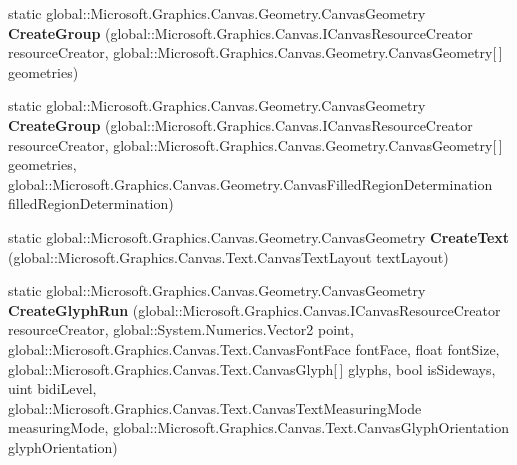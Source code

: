 \begin{DoxyCompactItemize}
static global\+::\+Microsoft.\+Graphics.\+Canvas.\+Geometry.\+Canvas\+Geometry {\bfseries Create\+Group} (global\+::\+Microsoft.\+Graphics.\+Canvas.\+I\+Canvas\+Resource\+Creator resource\+Creator, global\+::\+Microsoft.\+Graphics.\+Canvas.\+Geometry.\+Canvas\+Geometry\mbox{[}$\,$\mbox{]} geometries)
\item 
\mbox{\label{class_microsoft_1_1_graphics_1_1_canvas_1_1_geometry_1_1_canvas_geometry_a1af065a42d2349de0898d7f63c2af94a}} 
static global\+::\+Microsoft.\+Graphics.\+Canvas.\+Geometry.\+Canvas\+Geometry {\bfseries Create\+Group} (global\+::\+Microsoft.\+Graphics.\+Canvas.\+I\+Canvas\+Resource\+Creator resource\+Creator, global\+::\+Microsoft.\+Graphics.\+Canvas.\+Geometry.\+Canvas\+Geometry\mbox{[}$\,$\mbox{]} geometries, global\+::\+Microsoft.\+Graphics.\+Canvas.\+Geometry.\+Canvas\+Filled\+Region\+Determination filled\+Region\+Determination)
\item 
\mbox{\label{class_microsoft_1_1_graphics_1_1_canvas_1_1_geometry_1_1_canvas_geometry_a5c956c37368cb565497e9e95f12918df}} 
static global\+::\+Microsoft.\+Graphics.\+Canvas.\+Geometry.\+Canvas\+Geometry {\bfseries Create\+Text} (global\+::\+Microsoft.\+Graphics.\+Canvas.\+Text.\+Canvas\+Text\+Layout text\+Layout)
\item 
\mbox{\label{class_microsoft_1_1_graphics_1_1_canvas_1_1_geometry_1_1_canvas_geometry_aac0a557b41812921ee04b4413f0fb8f1}} 
static global\+::\+Microsoft.\+Graphics.\+Canvas.\+Geometry.\+Canvas\+Geometry {\bfseries Create\+Glyph\+Run} (global\+::\+Microsoft.\+Graphics.\+Canvas.\+I\+Canvas\+Resource\+Creator resource\+Creator, global\+::\+System.\+Numerics.\+Vector2 point, global\+::\+Microsoft.\+Graphics.\+Canvas.\+Text.\+Canvas\+Font\+Face font\+Face, float font\+Size, global\+::\+Microsoft.\+Graphics.\+Canvas.\+Text.\+Canvas\+Glyph\mbox{[}$\,$\mbox{]} glyphs, bool is\+Sideways, uint bidi\+Level, global\+::\+Microsoft.\+Graphics.\+Canvas.\+Text.\+Canvas\+Text\+Measuring\+Mode measuring\+Mode, global\+::\+Microsoft.\+Graphics.\+Canvas.\+Text.\+Canvas\+Glyph\+Orientation glyph\+Orientation)
\item 
\mbox{\label{class_microsoft_1_1_graphics_1_1_canvas_1_1_geometry_1_1_canvas_geometry_a42466cc94da19392c5dd77f1fd235a67}} 

\end{DoxyCompactItemize}
